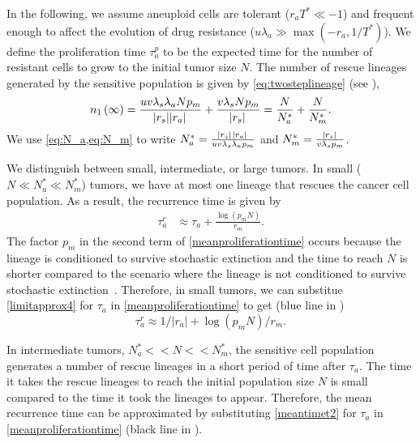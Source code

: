 \documentclass[12pt]{extarticle}
\renewcommand{\Delta}{r}
\begin{document}
\begin{appendices}
In the following, we assume aneuploid cells are tolerant ($\Delta_a T^* \ll -1$) and frequent enough to affect the evolution of drug resistance ($u\lambda_a \gg \max{(-\Delta_a, 1/T^*)}$). 
We define the proliferation time $\tau_a^p$  to be the expected time for the number of resistant cells to grow to the initial tumor size $N$.
The number of rescue lineages generated by the sensitive population is given by  \cref{eq:twosteplineage} (see ),
\begin{equation*}
n_1\left(\infty\right)=\frac{uv\lambda_s\lambda_aNp_m}{\abs{\Delta_s}\abs{\Delta_a}}+\frac{v\lambda_sNp_m}{\abs{\Delta_s}}=\frac{N}{N_a^*}+\frac{N}{N_m^*} .
\end{equation*}
We use \cref{eq:N_a,eq:N_m} to write $N_a^*=\frac{\abs{\Delta_s}\; \abs{\Delta_a}}{uv\lambda_s\lambda_ap_m}$ and $N_m^*=\frac{\abs{\Delta_s}}{v\lambda_sp_m}$.

We distinguish between small, intermediate, or large tumors.
In small ($N\ll N_a^*\ll N_m^*$) tumors, we have at most one lineage that rescues the cancer cell population.
As a result, the recurrence time is given by~\citep{avanzini2019cancer}
\begin{align}\label{meanproliferationtime}
\tau_a^r&\approx\tau_a+\frac{\log \left(p_mN\right)}{\Delta_m}.
\end{align}
The factor $p_m$ in the second term of \cref{meanproliferationtime} occurs because the lineage is conditioned to survive stochastic extinction and the time to reach $N$ is shorter compared to the scenario where the lineage is not conditioned to survive stochastic extinction~\citep{orr2014population,smith1974hitch}. %
Therefore, in small tumors, we can substitue \cref{limitapprox4} for $\tau_a$ in \cref{meanproliferationtime} to get (blue line in )
\begin{equation*}
\tau_a^r\approx1/|\Delta_a| + \log{\left(p_mN\right)}/\Delta_m .
\end{equation*}

In intermediate tumors, $N_a^* << N << N_m^*$, the sensitive cell population generates a number of rescue lineages in a short period of time after $\tau_a$. The time it takes the rescue lineages to reach the initial population size $N$ is small compared to the time it took the lineages to appear. Therefore, the mean recurrence time can be approximated by substituting \cref{meantimet2} for $\tau_a$ in \cref{meanproliferationtime} (black line in ).


\end{appendices}
\end{document}

